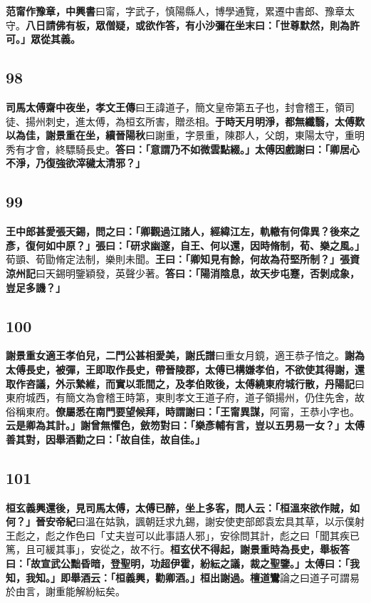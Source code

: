 \textbf{范甯作豫章，}{\footnotesize \textbf{中興書}曰甯，字武子，慎陽縣人，博學通覽，累遷中書郎、豫章太守。}\textbf{八日請佛有板，眾僧疑，或欲作答，有小沙彌在坐末曰：「世尊默然，則為許可。」眾從其義。}

\subsection*{98}

\textbf{司馬太傅齋中夜坐，}{\footnotesize \textbf{孝文王傳}曰王諱道子，簡文皇帝第五子也，封會稽王，領司徒、揚州刺史，進太傅，為桓玄所害，贈丞相。}\textbf{于時天月明淨，都無纖翳，太傅歎以為佳，謝景重在坐，}{\footnotesize \textbf{續晉陽秋}曰謝重，字景重，陳郡人，父朗，東陽太守，重明秀有才會，終驃騎長史。}\textbf{答曰：「意謂乃不如微雲點綴。」太傅因戲謝曰：「卿居心不淨，乃復強欲滓穢太清邪？」}

\subsection*{99}

\textbf{王中郎甚愛張天錫，問之曰：「卿觀過江諸人，經緯江左，軌轍有何偉異？後來之彥，復何如中原？」張曰：「研求幽邃，自王、何以還，因時脩制，荀、樂之風。」}{\footnotesize 荀顗、荀勖脩定法制，樂則未聞。}\textbf{王曰：「卿知見有餘，何故為苻堅所制？」}{\footnotesize \textbf{張資涼州記}曰天錫明鑒穎發，英聲少著。}\textbf{答曰：「陽消陰息，故天步屯蹇，否剝成象，豈足多譏？」}

\subsection*{100}

\textbf{謝景重女適王孝伯兒，二門公甚相愛美，}{\footnotesize \textbf{謝氏譜}曰重女月鏡，適王恭子愔之。}\textbf{謝為太傅長史，被彈，王即取作長史，帶晉陵郡，太傅已構嫌孝伯，不欲使其得謝，還取作咨議，外示縶維，而實以乖間之，及孝伯敗後，太傅繞東府城行散，}{\footnotesize \textbf{丹陽記}曰東府城西，有簡文為會稽王時第，東則孝文王道子府，道子領揚州，仍住先舍，故俗稱東府。}\textbf{僚屬悉在南門要望候拜，時謂謝曰：「王甯異謀，}{\footnotesize 阿甯，王恭小字也。}\textbf{云是卿為其計。」謝曾無懼色，斂笏對曰：「樂彥輔有言，豈以五男易一女？」太傅善其對，因舉酒勸之曰：「故自佳，故自佳。」}

\subsection*{101}

\textbf{桓玄義興還後，見司馬太傅，太傅已醉，坐上多客，問人云：「桓溫來欲作賊，如何？」}{\footnotesize \textbf{晉安帝紀}曰溫在姑孰，諷朝廷求九錫，謝安使吏部郎袁宏具其草，以示僕射王彪之，彪之作色曰「丈夫豈可以此事語人邪」，安徐問其計，彪之曰「聞其疾已篤，且可緩其事」，安從之，故不行。}\textbf{桓玄伏不得起，謝景重時為長史，舉板答曰：「故宣武公黜昏暗，登聖明，功超伊霍，紛紜之議，裁之聖鑒。」太傅曰：「我知，我知。」即舉酒云：「桓義興，勸卿酒。」桓出謝過。}{\footnotesize \textbf{檀道鸞}論之曰道子可謂易於由言，謝重能解紛紜矣。}

